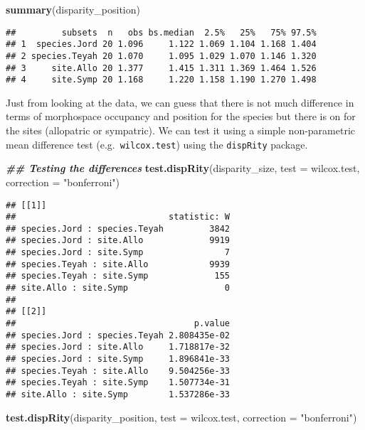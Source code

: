 \documentclass[
]{book}
\newenvironment{Shaded}{\begin{snugshade}}{\end{snugshade}}
\newcommand{\AttributeTok}[1]{\textcolor[rgb]{0.13,0.29,0.53}{#1}}
\newcommand{\DocumentationTok}[1]{\textcolor[rgb]{0.56,0.35,0.01}{\textbf{\textit{#1}}}}
\newcommand{\FunctionTok}[1]{\textcolor[rgb]{0.13,0.29,0.53}{\textbf{#1}}}
\newcommand{\NormalTok}[1]{#1}
\newcommand{\StringTok}[1]{\textcolor[rgb]{0.31,0.60,0.02}{#1}}
\begin{document}
\begin{Shaded}
\begin{Highlighting}[]
\FunctionTok{summary}\NormalTok{(disparity\_position)}
\end{Highlighting}
\end{Shaded}

\begin{verbatim}
##         subsets  n   obs bs.median  2.5%   25%   75% 97.5%
## 1  species.Jord 20 1.096     1.122 1.069 1.104 1.168 1.404
## 2 species.Teyah 20 1.070     1.095 1.029 1.070 1.146 1.320
## 3     site.Allo 20 1.377     1.415 1.311 1.369 1.464 1.526
## 4     site.Symp 20 1.168     1.220 1.158 1.190 1.270 1.498
\end{verbatim}

Just from looking at the data, we can guess that there is not much difference in terms of morphospace occupancy and position for the species but there is on for the sites (allopatric or sympatric).
We can test it using a simple non-parametric mean difference test (e.g.~\texttt{wilcox.test}) using the \texttt{dispRity} package.

\begin{Shaded}
\begin{Highlighting}[]
\DocumentationTok{\#\# Testing the differences}
\FunctionTok{test.dispRity}\NormalTok{(disparity\_size, }\AttributeTok{test =}\NormalTok{ wilcox.test, }\AttributeTok{correction =} \StringTok{"bonferroni"}\NormalTok{)}
\end{Highlighting}
\end{Shaded}

\begin{verbatim}
## [[1]]
##                              statistic: W
## species.Jord : species.Teyah         3842
## species.Jord : site.Allo             9919
## species.Jord : site.Symp                7
## species.Teyah : site.Allo            9939
## species.Teyah : site.Symp             155
## site.Allo : site.Symp                   0
## 
## [[2]]
##                                   p.value
## species.Jord : species.Teyah 2.808435e-02
## species.Jord : site.Allo     1.718817e-32
## species.Jord : site.Symp     1.896841e-33
## species.Teyah : site.Allo    9.504256e-33
## species.Teyah : site.Symp    1.507734e-31
## site.Allo : site.Symp        1.537286e-33
\end{verbatim}

\begin{Shaded}
\begin{Highlighting}[]
\FunctionTok{test.dispRity}\NormalTok{(disparity\_position, }\AttributeTok{test =}\NormalTok{ wilcox.test, }\AttributeTok{correction =} \StringTok{"bonferroni"}\NormalTok{)}
\end{Highlighting}
\end{Shaded}
\end{document}
